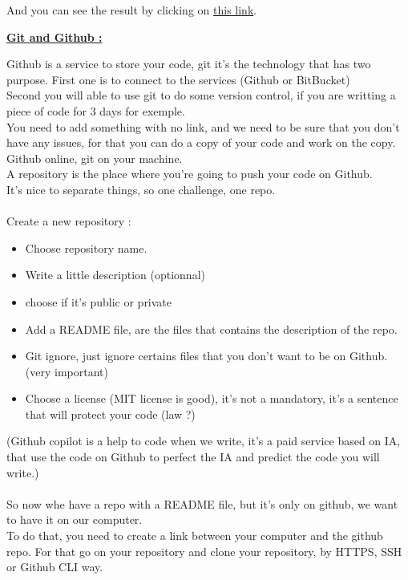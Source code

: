 \documentclass{article}
\begin{document}
And you can see the result by clicking on \href{https://github.com/WillPolet/Markdown}{this link}.
\newpage
\begin{center}
    \LARGE{\bf \underline {Git and Github :}} \\
\end{center}
Github is a service to store your code, git it's the technology that has two purpose. First one is to connect to the services (Github or BitBucket) \\
Second you will able to use git to do some version control, if you are writting a piece of code for 3 days for exemple. \\
You need to add something with no link, and we need to be sure that you don't have any issues, for that you can do a copy of your code and work on the copy. \\
Github online, git on your machine. \\
A repository is the place where you're going to push your code on Github. \\
It's nice to separate things, so one challenge, one repo. \\
\\ Create a new repository :
\begin{itemize}
    \item Choose repository name.
    \item Write a little description (optionnal)
    \item choose if it's public or private
    \item Add a README file, are the files that contains the description of the repo.
    \item Git ignore, just ignore certains files that you don't want to be on Github. (very important)
    \item Choose a license (MIT license is good), it's not a mandatory, it's a sentence that will protect your code (law ?)
\end{itemize}
(Github copilot is a help to code when we write, it's a paid service based on IA, that use the code on Github to perfect the IA and predict the code you will write.) \\ \\
So now whe have a repo with a README file, but it's only on github, we want to have it on our computer. \\
To do that, you need to create a link between your computer and the github repo. For that go on your repository and clone your repository, by HTTPS, SSH or Github CLI way. \\
\end{document}
